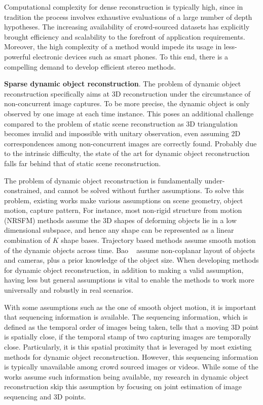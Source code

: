 Computational complexity for dense reconstruction is typically high, since in tradition the process involves exhaustive evaluations of a large number of depth hypotheses. The increasing availability of crowd-sourced datasets has explicitly brought efficiency and scalability to the forefront of application requirements.  Moreover, the high complexity of a method would impede its usage in less-powerful electronic devices such as smart phones. To this end, there is a compelling demand to develop efficient stereo methods.

\textbf{Sparse dynamic object reconstruction}.
The problem of dynamic object reconstruction specifically aims at 3D reconstruction under the circumstance of non-concurrent image captures. To be more precise, the dynamic object is only observed by one image at each time instance. This poses an additional challenge compared to the problem of static  scene reconstruction as 3D triangulation becomes invalid and impossible with unitary observation, even assuming 2D correspondences among non-concurrent images are correctly found. Probably due to the intrinsic difficulty, the state of the art for dynamic object reconstruction falls far behind that of static scene reconstruction.

The problem of dynamic object reconstruction is fundamentally under-constrained, and cannot be solved without further assumptions. 
To solve this problem, existing works make various assumptions on scene geometry, object motion, capture pattern, \etc
For instance, most non-rigid structure from motion (NRSFM) methods assume the 3D shapes of deforming objects lie in a low dimensional subspace, and hence any shape can be represented as a linear combination of $K$ shape bases. Trajectory based methods assume smooth motion of the dynamic objects across time. Bao \etal~ assume non-coplanar layout of objects and cameras, plus a prior knowledge of the object size. When developing methods for dynamic object reconstruction, in addition to making a valid assumption, having less but general assumptions is vital to enable the methods to work more universally and robustly in real scenarios. 

With some assumptions such as the one of smooth object motion, it is important that sequencing information is available. The sequencing information, which is defined as the temporal order of images being taken, tells that a moving 3D point is spatially close, if the temporal stamp of two capturing images are temporally close. Particularly, it is this spatial proximity that is leveraged by most existing methods for dynamic object reconstruction. However, this sequencing information is typically unavailable among crowd sourced images or videos. While some of the works assume such information being available, my research in dynamic object reconstruction skip this assumption by focusing on joint estimation of image sequencing and 3D points.

